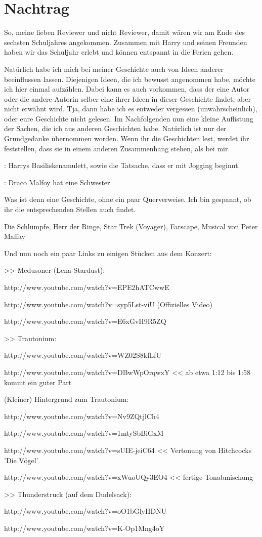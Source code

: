 \chapter{Nachtrag}


So, meine lieben Reviewer und nicht Reviewer, damit wären wir am Ende des sechsten Schuljahres angekommen. Zusammen mit Harry und seinen Freunden haben wir das Schuljahr erlebt und können entspannt in die Ferien gehen.

Natürlich habe ich mich bei meiner Geschichte auch von Ideen anderer beeinflussen lassen. Diejenigen Ideen, die ich bewusst angenommen habe, möchte ich hier einmal aufzählen. Dabei kann es auch vorkommen, dass der eine Autor oder die andere Autorin selber eine ihrer Ideen in dieser Geschichte findet, aber nicht erwähnt wird. Tja, dann habe ich es entweder vergessen (unwahrscheinlich), oder eure Geschichte nicht gelesen. Im Nachfolgenden nun eine kleine Auflistung der Sachen, die ich aus anderen Geschichten habe. Natürlich ist nur der Grundgedanke übernommen worden. Wenn ihr die Geschichten lest, werdet ihr feststellen, dass sie in einem anderen Zusammenhang stehen, als bei mir.

: Harrys Basiliskenamulett, sowie die Tatsache, dass er mit Jogging beginnt.

: Draco Malfoy hat eine Schwester

Was ist denn eine Geschichte, ohne ein paar Querverweise. Ich bin gespannt, ob ihr die entsprechenden Stellen auch findet.

Die Schlümpfe, Herr der Ringe, Star Trek (Voyager), Farscape, Musical von Peter Maffay

Und nun noch ein paar Links zu einigen Stücken aus dem Konzert:
\skipspace

>> Medusoner (Lena-Stardust):

http://www.youtube.com/watch?v=EPE2hATCwwE

http://www.youtube.com/watch?v=syp5Lst-viU (Offizielles Video)

http://www.youtube.com/watch?v=E6xGvH9R5ZQ
\skipspace

>> Trautonium:

http://www.youtube.com/watch?v=WZ02S8kfLfU

http://www.youtube.com/watch?v=DBwWpOrqwxY << ab etwa 1:12 bis 1:58 kommt ein guter Part

(Kleiner) Hintergrund zum Trautonium:

http://www.youtube.com/watch?v=Nv9ZQtjlCh4

http://www.youtube.com/watch?v=1mtySbBiGxM

http://www.youtube.com/watch?v=sUIE-jeiC64 << Vertonung von Hitchcocks 'Die Vögel'

http://www.youtube.com/watch?v=xWuoUQy3EO4 << fertige Tonabmischung
\skipspace

>> Thunderstruck (auf dem Dudelsack):

http://www.youtube.com/watch?v=oO1bGlyHDNU

http://www.youtube.com/watch?v=K-Op1Mng4oY
